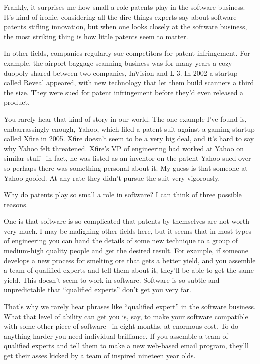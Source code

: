 \documentclass[12pt]{book}
\begin{document}
Frankly, it surprises me how small a role patents play in the software
business. It's kind of ironic, considering all the dire things experts
say about software patents stifling innovation, but when one looks
closely at the software business, the most striking thing is how little
patents seem to matter.

In other fields, companies regularly sue competitors for patent
infringement. For example, the airport baggage scanning business was for
many years a cozy duopoly shared between two companies, InVision and
L-3. In 2002 a startup called Reveal appeared, with new technology that
let them build scanners a third the size. They were sued for patent
infringement before they'd even released a product.

You rarely hear that kind of story in our world. The one example I've
found is, embarrassingly enough, Yahoo, which filed a patent suit
against a gaming startup called Xfire in 2005. Xfire doesn't seem to be
a very big deal, and it's hard to say why Yahoo felt threatened. Xfire's
VP of engineering had worked at Yahoo on similar stuff-- in fact, he was
listed as an inventor on the patent Yahoo sued over-- so perhaps there
was something personal about it. My guess is that someone at Yahoo
goofed. At any rate they didn't pursue the suit very vigorously.

Why do patents play so small a role in software? I can think of three
possible reasons.

One is that software is so complicated that patents by themselves are
not worth very much. I may be maligning other fields here, but it seems
that in most types of engineering you can hand the details of some new
technique to a group of medium-high quality people and get the desired
result. For example, if someone develops a new process for smelting ore
that gets a better yield, and you assemble a team of qualified experts
and tell them about it, they'll be able to get the same yield. This
doesn't seem to work in software. Software is so subtle and
unpredictable that ``qualified experts'' don't get you very far.

That's why we rarely hear phrases like ``qualified expert'' in the
software business. What that level of ability can get you is, say, to
make your software compatible with some other piece of software-- in
eight months, at enormous cost. To do anything harder you need
individual brilliance. If you assemble a team of qualified experts and
tell them to make a new web-based email program, they'll get their asses
kicked by a team of inspired nineteen year olds.
\end{document}
